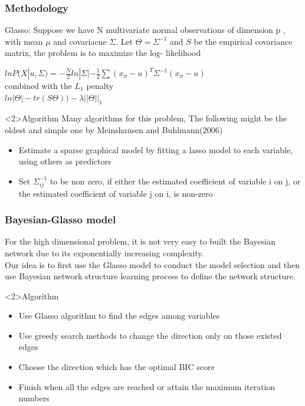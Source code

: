 \documentclass{beamer}
\begin{document}
\begin{frame}
\frametitle{Methodology}
  \begin{block}{Glasso:}
    Suppose we have N multivariate normal observations of dimension p , with mean $\mu$ and covariacne $\Sigma$. Let $\Theta=\Sigma^{-1}$ and $S$ be the empirical covariance matrix, the problem is to maximize the log- likelihood \\
    \begin{center}
    $lnP(X|u,\Sigma)=-\frac{N}{2}ln|\Sigma|-\frac{1}{2}\sum(x_n-u)^T \Sigma^{-1}(x_n-u)$\\
    combined with the $L_1$ penalty\\
    $ln |\Theta|- tr(S\Theta))-\lambda||\Theta||_1$
  \end{center}
  \end{block}

  \begin{block}<2>{Algorithm}
  Many algorithms for this problem, The following might be the oldest and simple one by Meinshausen and Buhlmann(2006)
    \begin{itemize}
        \item  Estimate a sparse graphical model by fitting a lasso model to each variable, using others as predictors
        \item  Set $\Sigma_{ij}^{-1}$ to be non zero, if either the estimated coefficient of variable i on j, or the
        estimated coefficient of variable j on i, is non-zero
    \end{itemize}
  \end{block}
\end{frame}

\begin{frame}
\frametitle{Bayesian-Glasso model}
 For the high dimensional problem, it is not very easy to built the Bayesian network due to its exponentially increasing complexity. \\
 Our idea is to first use the Glasso model to conduct the model selection and then use Bayesian network structure learning process
 to define the network structure. \\
   \begin{block}<2>{Algorithm}
    \begin{itemize}
        \item  Use Glasso algorithm to find the edges among variables
        \item  Use greedy search methods to change the direction only on those existed edges
        \item  Choose the direction which has the optimal BIC score
        \item  Finish when all the edges are reached or attain the maximum iteration numbers
    \end{itemize}
  \end{block}

\end{frame}
\end{document}
